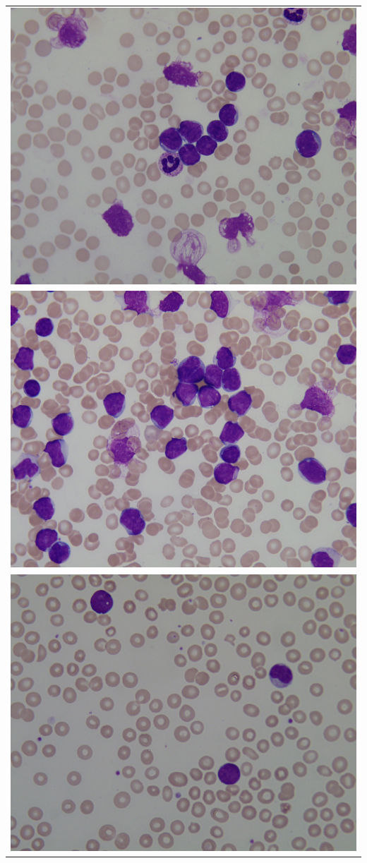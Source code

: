 \documentclass[
	a4paper,
	10pt,
	unnumberedsections,
	twoside,
]{research_article}
\begin{document}
\noindent\begin{tabular}{c}
    \includegraphics[width=\linewidth]{images/Im001_1.jpg} \\
    \includegraphics[width=\linewidth]{images/Im005_1.jpg} \\
    \includegraphics[width=\linewidth]{images/Im025_1.jpg} \\

\end{tabular}
\end{document}
